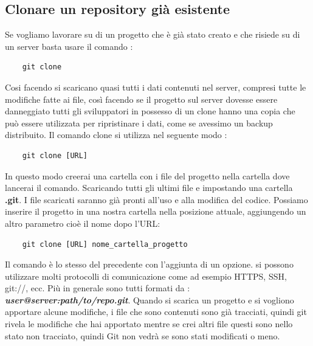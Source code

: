 \subsection{Clonare un repository già esistente}
Se vogliamo lavorare su di un progetto che è già stato creato e che risiede su di un server basta usare il comando :
\begin{lstlisting}
	git clone 
\end{lstlisting}
Cosi facendo si scaricano quasi tutti i dati contenuti nel server, compresi tutte le modifiche fatte ai file, così facendo se il progetto sul server dovesse essere danneggiato tutti gli sviluppatori in possesso di un clone hanno una copia che può essere utilizzata per ripristinare i dati, come se avessimo un backup distribuito.
Il comando clone si utilizza nel seguente modo :
\begin{lstlisting}
	git clone [URL]
\end{lstlisting}
In questo modo creerai una cartella con i file del progetto nella cartella dove lancerai il comando.
Scaricando tutti gli ultimi file e impostando una cartella \textbf{.git}. I file scaricati saranno già pronti all'uso e alla modifica del codice. Possiamo inserire il progetto in una nostra cartella nella posizione attuale, aggiungendo un altro parametro cioè il nome dopo l'URL:
\begin{lstlisting}
	git clone [URL] nome_cartella_progetto
\end{lstlisting} 
Il comando è lo stesso del precedente con l'aggiunta di un opzione. si possono utilizzare molti protocolli di comunicazione come ad esempio HTTPS, SSH, git://, ecc. Più in generale sono tutti formati da :  \textbf{\textit{user@server:path/to/repo.git}}.
Quando si scarica un progetto e si vogliono apportare alcune modifiche, i file che sono contenuti sono già tracciati, quindi git rivela le modifiche che hai apportato mentre se crei altri file questi sono nello stato non tracciato, quindi Git non vedrà se sono stati modificati o meno.


